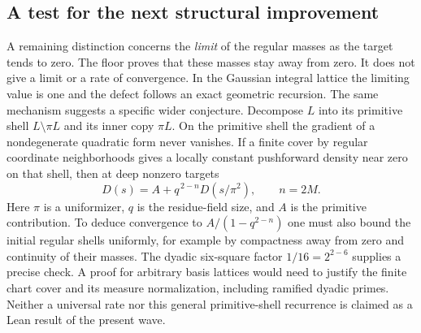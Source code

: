 \documentclass[12pt,letterpaper]{article}
\begin{document}
\subsection{A test for the next structural improvement}
A remaining distinction concerns the \emph{limit} of the regular masses as the target tends to zero. The floor proves that these masses stay away from zero. It does not give a limit or a rate of convergence. In the Gaussian integral lattice the limiting value is one and the defect follows an exact geometric recursion. The same mechanism suggests a specific wider conjecture. Decompose $L$ into its primitive shell $L\setminus\pi L$ and its inner copy $\pi L$. On the primitive shell the gradient of a nondegenerate quadratic form never vanishes. If a finite cover by regular coordinate neighborhoods gives a locally constant pushforward density near zero on that shell, then at deep nonzero targets
\[
       D(s)=A+q^{\,2-n}D(s/\pi^2), \qquad n=2M .
\]
Here $\pi$ is a uniformizer, $q$ is the residue-field size, and $A$ is the primitive contribution. To deduce convergence to $A/(1-q^{2-n})$ one must also bound the initial regular shells uniformly, for example by compactness away from zero and continuity of their masses. The dyadic six-square factor $1/16=2^{2-6}$ supplies a precise check. A proof for arbitrary basis lattices would need to justify the finite chart cover and its measure normalization, including ramified dyadic primes. Neither a universal rate nor this general primitive-shell recurrence is claimed as a Lean result of the present wave.
\end{document}
